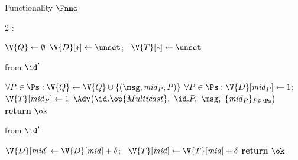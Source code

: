 \begin{interface}[nofloat]{Functionality $\Fnmc$ \\
\params{$\PID$, \quad $\Ps$, \quad $\admits$, \quad
$\uses := \{(\Adv,\serves)\}$, \quad $\pars := \Delta$}}

{\scriptsize
\setlength{\columnsep}{1.4em}
\begin{multicols}{2}
:
\begin{algorithmic}[1]
\setcounter{contline}{0}\algcont
\State $\V{Q} \gets \emptyset$
\State $\V{D}[*] \gets \unset$; \ $\V{T}[*] \gets \unset$
\algsave
\end{algorithmic}
\vspace{1.4ex}

 \quad from $\id'$
\begin{algorithmic}[1]
\algcont
\Req{$\msg \in \Msgs$}
\State $\forall P \in \Ps : \V{Q} \gets \V{Q} \uplus \{(\msg, \mathit{mid}_{P}, P)\}$ \label{ln:nmcfanout}
\State $\forall P \in \Ps : \V{D}[\mathit{mid}_{P}] \gets 1$; \ $\V{T}[\mathit{mid}_{P}] \gets 1$
\State $\Adv\bigl(\id.\op{Multicast},\ \id.P,\ \msg,\ \{\mathit{mid}_{P}\}_{P \in \Ps}\bigr)$ \label{ln:nmcleak}
\State \textbf{return} $\ok$
\algsave
\end{algorithmic}
\vspace{1.4ex}

 \quad from $\id'$
\begin{algorithmic}[1]
\algcont
{} \label{ln:nmcadvonly}
 \label{ln:nmcbound}
\State $\V{D}[\mathit{mid}] \gets \V{D}[\mathit{mid}] + \delta$; \ $\V{T}[\mathit{mid}] \gets \V{T}[\mathit{mid}] + \delta$
\State \textbf{return} $\ok$
\algsave
\end{algorithmic}
\vspace{1.4ex}


\end{multicols}}
\end{interface}
